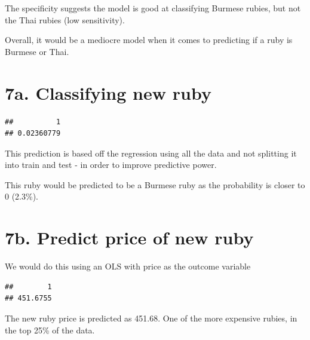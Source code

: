 \documentclass[
  8pt,
]{article}
\begin{document}
The specificity suggests the model is good at classifying Burmese
rubies, but not the Thai rubies (low sensitivity).

Overall, it would be a mediocre model when it comes to predicting if a
ruby is Burmese or Thai.

\hypertarget{a.-classifying-new-ruby}{%
\section{7a. Classifying new ruby}\label{a.-classifying-new-ruby}}

\begin{verbatim}
##          1 
## 0.02360779
\end{verbatim}

This prediction is based off the regression using all the data and not
splitting it into train and test - in order to improve predictive power.

This ruby would be predicted to be a Burmese ruby as the probability is
closer to 0 (2.3\%).

\hypertarget{b.-predict-price-of-new-ruby}{%
\section{7b. Predict price of new
ruby}\label{b.-predict-price-of-new-ruby}}

We would do this using an OLS with price as the outcome variable

\begin{verbatim}
##        1 
## 451.6755
\end{verbatim}

The new ruby price is predicted as 451.68. One of the more expensive
rubies, in the top 25\% of the data.
\end{document}

